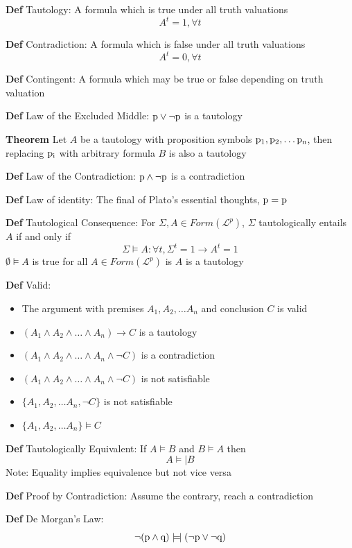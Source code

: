 \documentclass[11pt,notitlepage]{report}
\newcommand{\mc}[1]{\ensuremath{\mathcal{#1}}}
\newcommand{\modelsm}{\mathrel{\models\!\rvert}}
\begin{document}
\textbf{Def} Tautology: A formula which is true under all truth valuations
$$A^t = 1, \forall t$$

\textbf{Def} Contradiction: A formula which is false under all truth valuations
$$A^t = 0, \forall t$$

\textbf{Def} Contingent: A formula which may be true or false depending on truth valuation

\textbf{Def} Law of the Excluded Middle: $\rm p \vee \neg \rm p$ is a tautology

\textbf{Theorem} Let $A$ be a tautology with proposition symbols $\rm p_1, \rm p_2, \dots \rm p_n$, then replacing $\rm p_i$ with arbitrary formula $B$ is also a tautology

\textbf{Def} Law of the Contradiction: $\rm p \wedge \neg \rm p$ is a contradiction

\textbf{Def} Law of identity: The final of Plato's essential thoughts, $\rm p = \rm p$

\textbf{Def} Tautological Consequence: For $\Sigma, A \in Form(\mc L^p)$, $\Sigma$ tautologically entails $A$ if and only if
$$\Sigma \vDash A: \forall t, \Sigma^t = 1 \to A^t = 1$$
\hspace*{5mm} $\emptyset \vDash A$ is true for all $A \in Form(\mc L^p)$ is $A$ is a tautology

\textbf{Def} Valid:
\begin{itemize}
    \item The argument with premises $A_1, A_2, \dots A_n$ and conclusion $C$ is valid
    \item $(A_1 \wedge A_2 \wedge \dots \wedge A_n) \to C$ is a tautology
    \item $(A_1 \wedge A_2 \wedge \dots \wedge A_n \wedge \neg C)$ is a contradiction
    \item $(A_1 \wedge A_2 \wedge \dots \wedge A_n \wedge \neg C)$ is not satisfiable
    \item $\{A_1, A_2, \dots A_n, \neg C\}$ is not satisfiable
    \item $\{A_1, A_2, \dots A_n\} \vDash C$
\end{itemize}

\textbf{Def} Tautologically Equivalent: If $A \vDash B$ and $B \vDash A$ then
$$A \modelsm B$$
\hspace*{5mm} Note: Equality implies equivalence but not vice versa

\textbf{Def} Proof by Contradiction: Assume the contrary, reach a contradiction

\textbf{Def} De Morgan's Law: 
$$\neg(\rm p \wedge \rm q) \modelsm (\neg \rm p \vee \neg \rm q)$$
\end{document}

